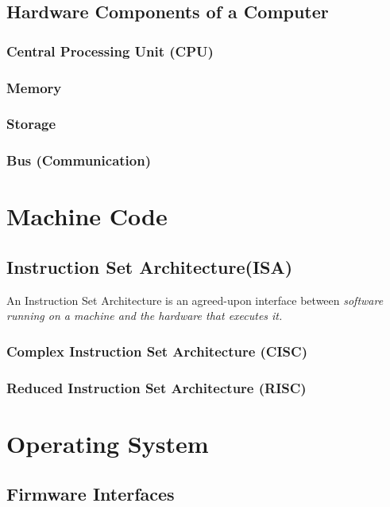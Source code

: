 \documentclass[pdftex,10pt]{article}
\begin{document}
\subsection{Hardware Components of a Computer}

\subsubsection{Central Processing Unit (CPU)}

\subsubsection{Memory}

\subsubsection{Storage}

\subsubsection{Bus (Communication)}


\section{Machine Code}
\subsection{Instruction Set Architecture(ISA)}

An Instruction Set Architecture is an agreed-upon interface between \em{software} running on a machine and the \em{hardware} that executes it.


\subsubsection{Complex Instruction Set Architecture (CISC)}
\subsubsection{Reduced Instruction Set Architecture (RISC)}

\section{Operating System}

\subsection{Firmware Interfaces}
\end{document}
